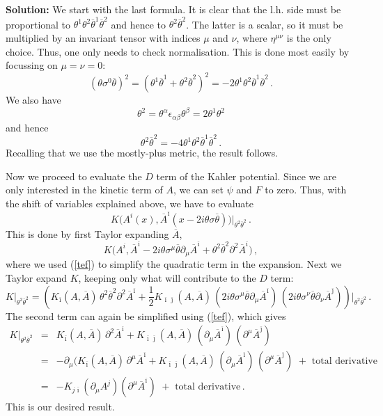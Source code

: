 \documentclass[12pt]{article}
\newcommand{\be}{\begin{equation}}
\newcommand{\ee}{\end{equation}}
\newcommand{\bea}{\begin{eqnarray}}
\newcommand{\eea}{\end{eqnarray}}
\newcommand{\ol}{\overline}
\numberwithin{equation}{section}
\begin{document}
\noindent
{\bf Solution:} We start with the last formula. It is clear that the l.h. side must be proportional to $\theta^1\theta^2\ol{\theta}^1\ol{\theta}^2$ and hence to $\theta^2\ol{\theta}^2$. The latter is a scalar, so it must be multiplied by an invariant tensor with indices $\mu$ and $\nu$, where $\eta^{\mu\nu}$ is the only choice. Thus, one only needs to check normalisation. This is done most easily by focussing on $\mu=\nu=0$:
\be
(\theta\sigma^0\ol{\theta})^2=\left(\theta^1\ol{\theta}^1+\theta^2\ol{\theta}^2 \right)^2 = -2\theta^1\theta^2\ol{\theta}^1\ol{\theta}^2\,. 
\ee
We also have
\be
\theta^2=\theta^\alpha\epsilon_{\alpha\beta}\theta^\beta=2\theta^1\theta^2
\ee
and hence
\be
\theta^2\ol{\theta}^2=-4\theta^1\theta^2\ol{\theta}^1\ol{\theta}^2\,.
\ee
Recalling that we use the mostly-plus metric, the result follows. 

Now we proceed to evaluate the $D$ term of the Kahler potential. Since we are only interested in the kinetic term of $A$, we can set $\psi$ and $F$ to zero. Thus, with the shift of variables explained above, we have to evaluate
\be
K\Big(A^i(x),\ol{A}^{\ol{\imath}}(x-2i\theta\sigma\ol{\theta})\Big)\Big|_{\theta^2 \ol{\theta}^2}\,.
\ee
This is done by first Taylor expanding $\ol{A}$,
\be
K\Big(A^i,\ol{A}^{\ol{\imath}}-2i\theta\sigma^\mu\ol{\theta}\partial_\mu \ol{A}^{\ol{\imath}}+\theta^2\ol{\theta}^2\partial^2\ol{A}^{\ol{\imath}}\Big)\,,
\ee
where we used (\ref{tef}) to simplify the quadratic term in the expansion. Next we Taylor expand $K$, keeping only what will contribute to the $D$ term:
\be
K\Big|_{\theta^2\ol{\theta}^2}=\left(K_{\ol{\imath}}(A,\ol{A})\,\theta^2\ol{\theta}^2 \partial^2 \ol{A}^{\ol{\imath}} +\frac{1}{2}K_{\ol{\imath}\ol{\jmath}} (A,\ol{A})\,(2i\theta \sigma^\mu \ol{\theta}\partial_\mu \ol{A}^{\ol{\imath}})\, (2i\theta\sigma^\nu \ol{\theta}\partial_\nu \ol{A}^{\ol{\jmath}})\right) \Big|_{\theta^2\ol{\theta}^2}\,.
\ee
The second term can again be simplified using (\ref{tef}), which gives
\bea
K\Big|_{\theta^2\ol{\theta}^2}&=&K_{\ol{\imath}}(A,\ol{A})\,\partial^2 \ol{A}^{\ol{\imath}} + K_{\ol{\imath}\ol{\jmath}}(A,\ol{A})\, (\partial_\mu \ol{A}^{\ol{\imath}})\, (\partial^\mu \ol{A}^{\ol{\jmath}})
\\
&=& -\partial_\mu(K_{\ol{\imath}}(A,\ol{A})\,\partial^\mu \ol{A}^{\ol{\imath}} + K_{\ol{\imath}\ol{\jmath}}(A,\ol{A})\,(\partial_\mu \ol{A}^{\ol{\imath}})\, (\partial^\mu \ol{A}^{\ol{\jmath}})\,\,+\,\,\mbox{total derivative}
\nonumber \\
&=& -K_{j\ol{\imath}}(\partial_\mu A^j)(\partial^\mu \ol{A}^{\ol{\imath}}) 
\,\,+\,\,\mbox{total derivative}\,.\nonumber
\eea
This is our desired result.
\end{document}
